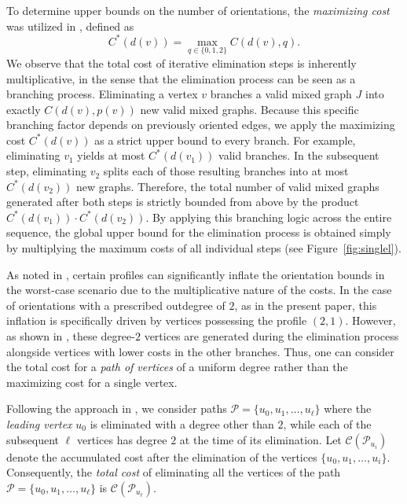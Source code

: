 \documentclass{article}
\begin{document}
        To determine upper bounds on the number of orientations, the \emph{maximizing cost} was utilized in \cite{bet,bev}, defined as 
        \[ C^*(d(v))= \max_{q\in \{0,1,2\}}  C(d(v), q). \]
        We observe that the total cost of iterative elimination steps is inherently multiplicative, in the sense that the elimination process can be seen as a branching process. 
        Eliminating a vertex $v$ branches a valid mixed graph $J$ into exactly $C(d(v), p(v))$ new valid mixed graphs. 
        Because this specific branching factor depends on previously oriented edges, we apply the maximizing cost $C^*(d(v))$ as a strict upper bound  to every branch.
        For example, eliminating $v_1$ yields at most $C^*(d(v_1))$ valid branches. 
        In the subsequent step, eliminating $v_2$ splits each of those resulting branches into at most $C^*(d(v_2))$ new graphs. 
        Therefore, the total number of valid mixed graphs generated after both steps is strictly bounded from above by the product $C^*(d(v_1)) \cdot C^*(d(v_2))$. 
        By applying this branching logic across the entire sequence, the global upper bound for the elimination process is obtained simply by multiplying the maximum costs of all individual steps (see Figure~\ref{fig:singlel}).

    
        As noted in \cite{bev}, certain profiles can significantly inflate the orientation bounds in the worst-case scenario due to the multiplicative nature of the costs.
        In the case of orientations with a prescribed outdegree of $2$, as in the present paper, this inflation is specifically driven by vertices possessing the profile $(2,1)$. 
        However, as shown in \cite{bet}, these degree-$2$ vertices are generated during the elimination process alongside vertices with lower costs in the other branches.
        Thus, one can consider the total cost for a \emph{path of vertices} of a uniform degree rather than the maximizing cost for a single vertex.

        Following the approach in \cite{bet}, we consider paths $\mathcal{P}=\{u_0, u_1, \dots, u_\ell\}$ where the \emph{leading vertex} $u_0$ is eliminated with a degree other than $2$, while each of the subsequent $\ell$ vertices has degree $2$ at the time of its elimination.
        Let $\mathcal{C}(\mathcal{P}_{u_i})$ denote the accumulated cost after the elimination of the vertices $\{u_0, u_1, \ldots,u_i\}$.
        Consequently, the \emph{total cost} of eliminating all the vertices of the path $\mathcal{P}=\{u_0, u_1, \dots, u_\ell\}$ is $\mathcal{C}(\mathcal{P}_{u_{\ell}})$.
\end{document}
